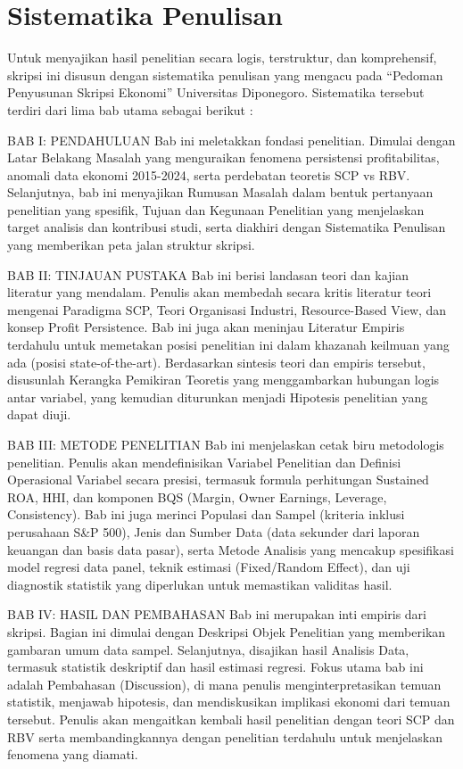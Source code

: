 \documentclass[12pt,a4paper]{report}
\begin{document}
\hypertarget{sistematika-penulisan}{%
\section{Sistematika Penulisan}\label{sistematika-penulisan}}

Untuk menyajikan hasil penelitian secara logis, terstruktur, dan
komprehensif, skripsi ini disusun dengan sistematika penulisan yang
mengacu pada ``Pedoman Penyusunan Skripsi Ekonomi'' Universitas
Diponegoro. Sistematika tersebut terdiri dari lima bab utama sebagai
berikut :

BAB I: PENDAHULUAN Bab ini meletakkan fondasi penelitian. Dimulai dengan
Latar Belakang Masalah yang menguraikan fenomena persistensi
profitabilitas, anomali data ekonomi 2015-2024, serta perdebatan
teoretis SCP vs RBV. Selanjutnya, bab ini menyajikan Rumusan Masalah
dalam bentuk pertanyaan penelitian yang spesifik, Tujuan dan Kegunaan
Penelitian yang menjelaskan target analisis dan kontribusi studi, serta
diakhiri dengan Sistematika Penulisan yang memberikan peta jalan
struktur skripsi.

BAB II: TINJAUAN PUSTAKA Bab ini berisi landasan teori dan kajian
literatur yang mendalam. Penulis akan membedah secara kritis literatur
teori mengenai Paradigma SCP, Teori Organisasi Industri, Resource-Based
View, dan konsep Profit Persistence. Bab ini juga akan meninjau
Literatur Empiris terdahulu untuk memetakan posisi penelitian ini dalam
khazanah keilmuan yang ada (posisi state-of-the-art). Berdasarkan
sintesis teori dan empiris tersebut, disusunlah Kerangka Pemikiran
Teoretis yang menggambarkan hubungan logis antar variabel, yang kemudian
diturunkan menjadi Hipotesis penelitian yang dapat diuji.

BAB III: METODE PENELITIAN Bab ini menjelaskan cetak biru metodologis
penelitian. Penulis akan mendefinisikan Variabel Penelitian dan Definisi
Operasional Variabel secara presisi, termasuk formula perhitungan
Sustained ROA, HHI, dan komponen BQS (Margin, Owner Earnings, Leverage,
Consistency). Bab ini juga merinci Populasi dan Sampel (kriteria inklusi
perusahaan S\&P 500), Jenis dan Sumber Data (data sekunder dari laporan
keuangan dan basis data pasar), serta Metode Analisis yang mencakup
spesifikasi model regresi data panel, teknik estimasi (Fixed/Random
Effect), dan uji diagnostik statistik yang diperlukan untuk memastikan
validitas hasil.

BAB IV: HASIL DAN PEMBAHASAN Bab ini merupakan inti empiris dari
skripsi. Bagian ini dimulai dengan Deskripsi Objek Penelitian yang
memberikan gambaran umum data sampel. Selanjutnya, disajikan hasil
Analisis Data, termasuk statistik deskriptif dan hasil estimasi regresi.
Fokus utama bab ini adalah Pembahasan (Discussion), di mana penulis
menginterpretasikan temuan statistik, menjawab hipotesis, dan
mendiskusikan implikasi ekonomi dari temuan tersebut. Penulis akan
mengaitkan kembali hasil penelitian dengan teori SCP dan RBV serta
membandingkannya dengan penelitian terdahulu untuk menjelaskan fenomena
yang diamati.
\end{document}
